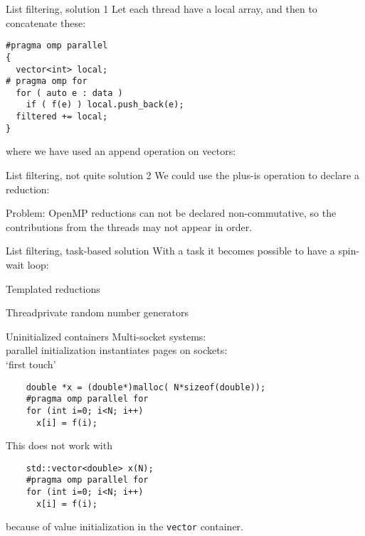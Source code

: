 \documentclass[10pt]{beamer}
\begin{document}
\begin{numberedframe}{List filtering, solution 1}
  Let each thread have a local array,
  and then to concatenate these:
\begin{lstlisting}
#pragma omp parallel
{
  vector<int> local;
# pragma omp for
  for ( auto e : data )
    if ( f(e) ) local.push_back(e);
  filtered += local;
}
\end{lstlisting}
where we have used an append operation on vectors:
\end{numberedframe}

\begin{numberedframe}{List filtering, not quite solution 2}
We could use the plus-is operation to declare a reduction:

Problem: OpenMP reductions can not be declared non-commutative,
so the contributions from the threads
may not appear in order.

\end{numberedframe}

\begin{numberedframe}{List filtering, task-based solution}
With a task it becomes possible to have a spin-wait loop:
\end{numberedframe}

\begin{numberedframe}{Templated reductions}
  
\end{numberedframe}


\begin{numberedframe}{Threadprivate random number generators}
  
\end{numberedframe}

\begin{numberedframe}{Uninitialized containers}
  Multi-socket systems:\\
  parallel initialization instantiates pages on sockets:\\
  `first touch'
  \begin{lstlisting}
    double *x = (double*)malloc( N*sizeof(double));
    #pragma omp parallel for
    for (int i=0; i<N; i++)
      x[i] = f(i);
  \end{lstlisting}
  This does not work with
  \begin{lstlisting}
    std::vector<double> x(N);
    #pragma omp parallel for
    for (int i=0; i<N; i++)
      x[i] = f(i);
  \end{lstlisting}
  because of value initialization in the \lstinline{vector} container.
\end{numberedframe}
\end{document}
